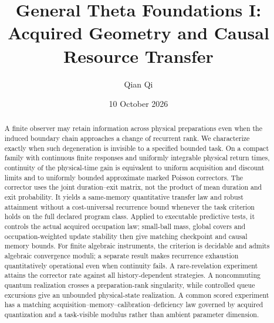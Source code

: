 \documentclass[11pt]{amsart}
\title[General Theta Foundations I]{General Theta Foundations I:\\Acquired Geometry and Causal Resource Transfer}
\author{Qian Qi}
\date{10 October 2026}
\theoremstyle{definition}\newtheorem{definition}[theorem]{Definition}
\theoremstyle{remark}\newtheorem{remark}[theorem]{Remark}
\begin{document}
\begin{abstract}
A finite observer may retain information across physical preparations even when the induced boundary chain approaches a change of recurrent rank. We characterize exactly when such degeneration is invisible to a specified bounded task. On a compact family with continuous finite responses and uniformly integrable physical return times, continuity of the physical-time gain is equivalent to uniform acquisition and discount limits and to uniformly bounded approximate marked Poisson correctors. The corrector uses the joint duration--exit matrix, not the product of mean duration and exit probability. It yields a same-memory quantitative transfer law and robust attainment without a cost-universal recurrence bound whenever the task criterion holds on the full declared program class. Applied to executable predictive tests, it controls the actual acquired occupation law; small-ball mass, global covers and occupation-weighted update stability then give matching checkpoint and causal memory bounds. For finite algebraic instruments, the criterion is decidable and admits algebraic convergence moduli; a separate result makes recurrence exhaustion quantitatively operational even when continuity fails. A rare-revelation experiment attains the corrector rate against all history-dependent strategies. A noncommuting quantum realization crosses a preparation-rank singularity, while controlled queue excursions give an unbounded physical-state realization. A common scored experiment has a matching acquisition--memory--calibration--deficiency law governed by acquired quantization and a task-visible modulus rather than ambient parameter dimension.
\end{abstract}
\maketitle










\end{document}
